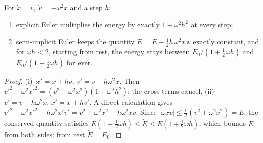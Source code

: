 \begin{theorem}
\label{thm:F-energy}
For $\dot x = v$, $\dot v = -\omega^2x$ and a step $h$:
\begin{enumerate}[label=(\roman*)]
  \item explicit Euler multiplies the energy by exactly $1 + \omega^2h^2$ at every step;
  \item semi-implicit Euler keeps the quantity $\tilde E = E - \tfrac12h\,\omega^2x\,v$ exactly constant, and for $\omega h < 2$, starting from rest, the energy stays between $E_0/(1 + \tfrac12\omega h)$ and $E_0/(1 - \tfrac12\omega h)$ for ever.
\end{enumerate}
\end{theorem}
\begin{proof}
(i)~$x' = x + hv$, $v' = v - h\omega^2x$. Then $v'^2 + \omega^2x'^2 = (v^2 + \omega^2x^2)(1 + \omega^2h^2)$; the cross terms cancel. (ii)~$v' = v - h\omega^2x$, $x' = x + hv'$. A direct calculation gives $v'^2 + \omega^2x'^2 - h\omega^2x'v' = v^2 + \omega^2x^2 - h\omega^2xv$. Since $|\omega x v| \le \tfrac12(v^2 + \omega^2x^2) = E$, the conserved quantity satisfies $E(1 - \tfrac12\omega h) \le \tilde E \le E(1 + \tfrac12\omega h)$, which bounds $E$ from both sides; from rest $\tilde E = E_0$.
\end{proof}

